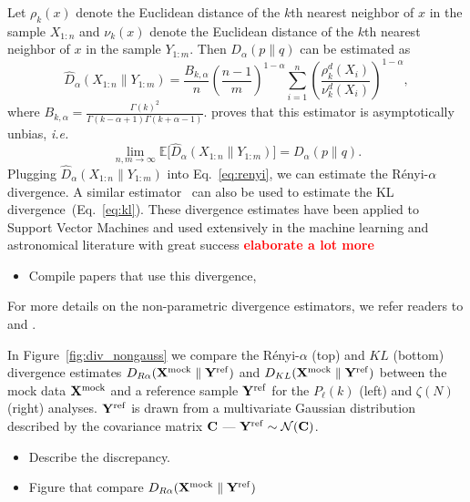 \documentclass[12pt, letterpaper, preprint]{aastex}
\newcommand{\bitem}{\begin{itemize}}
\newcommand{\eitem}{\end{itemize}}
\newcommand{\beq}{\begin{equation}}
\newcommand{\eeq}{\end{equation}}
\newcommand{\todo}[1]{{\bf \textcolor{red}{#1}}}
\begin{document}
Let $\rho_k(x)$ denote the Euclidean distance of the $k$th nearest neighbor 
of $x$ in the sample $X_{1:n}$ and $\nu_k(x)$ denote the Euclidean distance 
of the $k$th nearest neighbor of $x$ in the sample $Y_{1:m}$. Then 
$D_{\alpha}(p \parallel q)$ can be estimated as 
\beq \label{eq:d_alpha_est}
\hat{D}_{\alpha}(X_{1:n} \parallel Y_{1:m}) = \frac{B_{k,\alpha}}{n} \left(\frac{n-1}{m}\right)^{1-\alpha}
\sum\limits_{i=1}^{n} \left(\frac{\rho_k^{d}(X_i)}{\nu_k^{d}(X_i)} \right)^{1-\alpha},
\eeq
where $B_{k, \alpha} = \frac{\Gamma(k)^2}{\Gamma(k-\alpha+1)\Gamma(k+\alpha-1)}$. 
\cite{poczos2012} proves that this estimator is asymptotically unbias, \emph{i.e.} 
\beq
\lim_{n, m \rightarrow \infty} \mathbb{E} \big[ \hat{D}_{\alpha} (X_{1:n} \parallel Y_{1:m}) \big] = D_{\alpha} (p \parallel q). 
\eeq
Plugging $\hat{D}_{\alpha}(X_{1:n} \parallel Y_{1:m})$ into Eq.~\ref{eq:renyi},
we can estimate the R\'enyi-$\alpha$ divergence. A similar estimator~\citep{wang2009} 
can also be used to estimate the KL divergence~(Eq.~\ref{eq:kl}). 
These divergence estimates have been applied to Support Vector Machines and used 
extensively in the machine learning and astronomical literature with great success 
\todo{elaborate a lot more} 
\bitem 
    \item Compile papers that use this divergence, \cite{ntampaka2015, ntampaka2016}
\eitem
For more details on the non-parametric divergence estimators, we refer readers to 
\cite{poczos2012} and \cite{krishnamurthy2014}.

In Figure~\ref{fig:div_nongauss} we compare the R\'enyi-$\alpha$ 
(top) and $KL$ (bottom) divergence estimates 
$D_{R\alpha}({\bf X}^\mathrm{mock} \parallel {\bf Y}^\mathrm{ref})$ and 
$D_{KL}({\bf X}^\mathrm{mock} \parallel {\bf Y}^\mathrm{ref})$
between the mock data ${\bf X}^\mathrm{mock}$ and a reference sample 
${\bf Y}^\mathrm{ref}$ for the $P_\ell(k)$ (left) and $\zeta(N)$ (right) analyses.
${\bf Y}^\mathrm{ref}$ is drawn from a multivariate Gaussian distribution 
described by the covariance matrix ${\bf C}$ --- 
${\bf Y}^\mathrm{ref} \sim \mathcal{N}({\bf C})$. 
\bitem 
    \item Describe the discrepancy. 
    \item Figure that compare $D_{R\alpha}({\bf X}^\mathrm{mock} \parallel {\bf Y}^\mathrm{ref})$
\eitem
\end{document}
